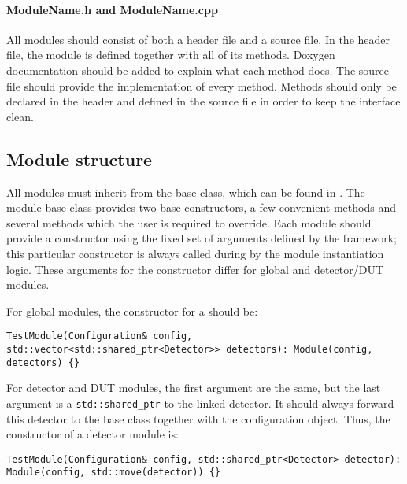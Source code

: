 \paragraph{ModuleName.h and ModuleName.cpp}
All modules should consist of both a header file and a source file.
In the header file, the module is defined together with all of its methods.
Doxygen documentation should be added to explain what each method does.
The source file should provide the implementation of every method.
Methods should only be declared in the header and defined in the source file in order to keep the interface clean.

\subsection{Module structure}
\label{sec:module_structure}
All modules must inherit from the  base class, which can be found in .
The module base class provides two base constructors, a few convenient methods and several methods which the user is required to override.
Each module should provide a constructor using the fixed set of arguments defined by the framework; this particular constructor is always called during by the module instantiation logic.
These arguments for the constructor differ for global and detector/DUT modules.

For global modules, the constructor for a  should be:
\begin{verbatim}
TestModule(Configuration& config, std::vector<std::shared_ptr<Detector>> detectors): Module(config, detectors) {}
\end{verbatim}

For detector and DUT modules, the first argument are the same, but the last argument is a \texttt{std::shared\_ptr} to the linked detector.
It should always forward this detector to the base class together with the configuration object.
Thus, the constructor of a detector module is:
\begin{verbatim}
TestModule(Configuration& config, std::shared_ptr<Detector> detector): Module(config, std::move(detector)) {}
\end{verbatim}

